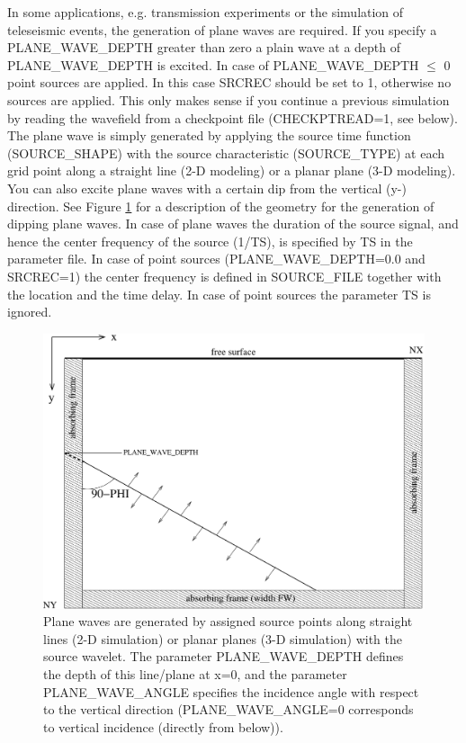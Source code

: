 \documentclass[11pt,onecolumn,oneside]{article}
\begin{document}
In some applications, e.g. transmission experiments or the simulation of teleseismic events, the generation of plane waves are required.  If you specify a PLANE\_WAVE\_DEPTH greater than zero a plain wave at a depth of PLANE\_WAVE\_DEPTH is excited. In case of PLANE\_WAVE\_DEPTH $\le$ 0 point sources are applied. In this case SRCREC should be set to 1, otherwise no sources are applied.
This only makes sense if you continue a previous simulation by reading the wavefield from a checkpoint file (CHECKPTREAD=1, see below). The plane wave is simply generated by applying the source time function (SOURCE\_SHAPE) with the source characteristic (SOURCE\_TYPE) at each grid point along a straight line (2-D modeling) or a planar plane (3-D modeling). You can also excite plane waves with a certain dip from the vertical (y-) direction. See Figure \ref{fig_plane_wave} for a description of the geometry for the generation of dipping plane waves. In case of plane waves the duration of the source signal, and hence the center frequency of the source (1/TS), is specified by TS in the parameter file. In case of point sources (PLANE\_WAVE\_DEPTH=0.0 and SRCREC=1) the center frequency is defined in SOURCE\_FILE together with the location and the time delay. In case of point sources the parameter TS is ignored.

\begin{figure}[htb]
\begin{center}
\includegraphics[width=12cm,angle=0]{figures/plane_wave.pdf}
\end{center}
\caption{Plane waves are generated by assigned source points along  straight lines (2-D simulation) or planar planes (3-D simulation) with the source wavelet. The parameter PLANE\_WAVE\_DEPTH defines the depth of this line/plane at x=0, and the parameter PLANE\_WAVE\_ANGLE specifies the incidence angle with respect to the vertical direction (PLANE\_WAVE\_ANGLE=0 corresponds to vertical incidence (directly from below)).}
\label{fig_plane_wave}
\end{figure}
\end{document}
